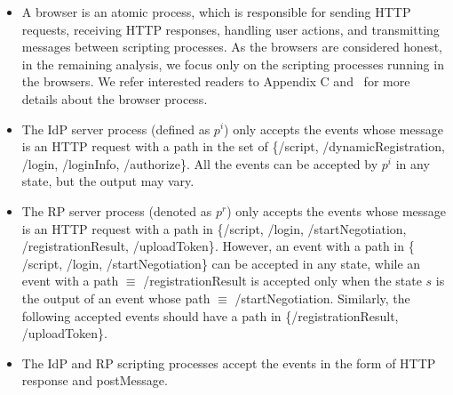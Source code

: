 \begin{itemize}
\item A browser is an atomic process, which is responsible for sending HTTP requests, receiving HTTP responses, handling user actions, and transmitting messages between scripting processes. As the browsers are considered honest, in the remaining analysis, we focus only on the scripting processes running in the browsers. We refer interested readers to Appendix C and~\cite{SPRESSO} for more details about the browser process.
\item The IdP server process (defined as $p^i$) only accepts the events whose message is an HTTP request with a path in the set of {\sf \{/script, /dynamicRegistration, /login, /loginInfo, /authorize\}}. %
All the events can be accepted by $p^i$ in any state, but the output may vary. %
\item The RP server process (denoted as $p^r$) only accepts the events whose message is an HTTP request with a path in {\sf \{/script, /login, /startNegotiation, /registrationResult, /uploadToken\}}. %
However, an event with a path in {\sf \{ /script, /login, /startNegotiation\}} can be accepted in any state, while an event with a path $\equiv$ {\sf /registrationResult} is accepted only when the state $s$ is the output of an event whose path $\equiv$ {\sf /startNegotiation}. Similarly, the following accepted events should have a path in {\sf \{/registrationResult, /uploadToken\}}.
\item The IdP and RP scripting processes accept the events in the form of HTTP response and postMessage. %
\end{itemize}

